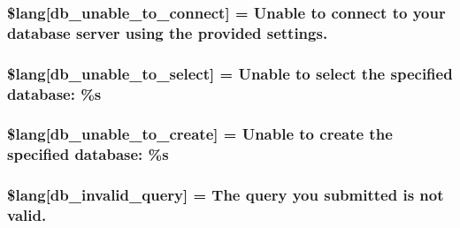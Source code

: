 \subsubsection[{\$lang}]{\setlength{\rightskip}{0pt plus 5cm}\$lang\mbox{[}\textquotesingle{}db\+\_\+unable\+\_\+to\+\_\+connect\textquotesingle{}\mbox{]} = \textquotesingle{}Unable to connect to your database server using the provided settings.\textquotesingle{}}\label{_admin_2system_2language_2english_2db__lang_8php_aa5935b86c957eb15ac7d41cf84143d66}
\hypertarget{_admin_2system_2language_2english_2db__lang_8php_a3c93974df838c0e036690874108715ea}{}
\subsubsection[{\$lang}]{\setlength{\rightskip}{0pt plus 5cm}\$lang\mbox{[}\textquotesingle{}db\+\_\+unable\+\_\+to\+\_\+select\textquotesingle{}\mbox{]} = \textquotesingle{}Unable to select the specified database\+: \%s\textquotesingle{}}\label{_admin_2system_2language_2english_2db__lang_8php_a3c93974df838c0e036690874108715ea}
\hypertarget{_admin_2system_2language_2english_2db__lang_8php_a4266e3b235feb16d9cf2e88afd1fedac}{}
\subsubsection[{\$lang}]{\setlength{\rightskip}{0pt plus 5cm}\$lang\mbox{[}\textquotesingle{}db\+\_\+unable\+\_\+to\+\_\+create\textquotesingle{}\mbox{]} = \textquotesingle{}Unable to create the specified database\+: \%s\textquotesingle{}}\label{_admin_2system_2language_2english_2db__lang_8php_a4266e3b235feb16d9cf2e88afd1fedac}
\hypertarget{_admin_2system_2language_2english_2db__lang_8php_a2cbf4ee929f45a29a0dcf21280bad485}{}
\subsubsection[{\$lang}]{\setlength{\rightskip}{0pt plus 5cm}\$lang\mbox{[}\textquotesingle{}db\+\_\+invalid\+\_\+query\textquotesingle{}\mbox{]} = \textquotesingle{}The query you submitted is not valid.\textquotesingle{}}\label{_admin_2system_2language_2english_2db__lang_8php_a2cbf4ee929f45a29a0dcf21280bad485}
\hypertarget{_admin_2system_2language_2english_2db__lang_8php_a0f5d469f071f2b5327b44761f4a06396}{}
